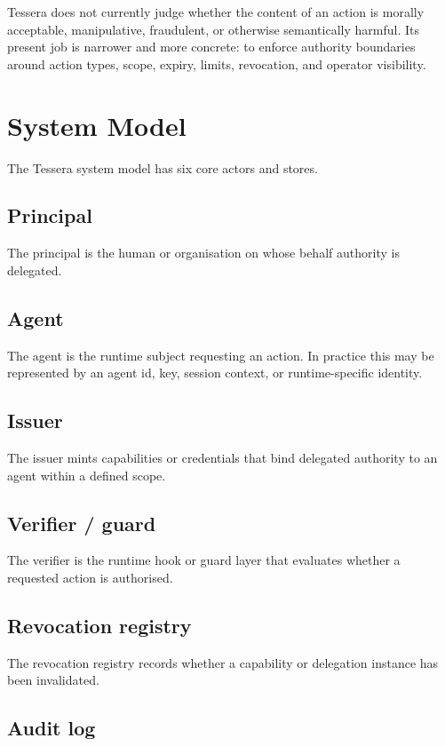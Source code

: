\documentclass[11pt, a4paper]{article}
\begin{document}
Tessera does not currently judge whether the content of an action is morally acceptable, manipulative, fraudulent, or otherwise semantically harmful. Its present job is narrower and more concrete: to enforce authority boundaries around action types, scope, expiry, limits, revocation, and operator visibility.

\section{System Model}

The Tessera system model has six core actors and stores.

\subsection{Principal}

The principal is the human or organisation on whose behalf authority is delegated.

\subsection{Agent}

The agent is the runtime subject requesting an action. In practice this may be represented by an agent id, key, session context, or runtime-specific identity.

\subsection{Issuer}

The issuer mints capabilities or credentials that bind delegated authority to an agent within a defined scope.

\subsection{Verifier / guard}

The verifier is the runtime hook or guard layer that evaluates whether a requested action is authorised.

\subsection{Revocation registry}

The revocation registry records whether a capability or delegation instance has been invalidated.

\subsection{Audit log}
\end{document}
